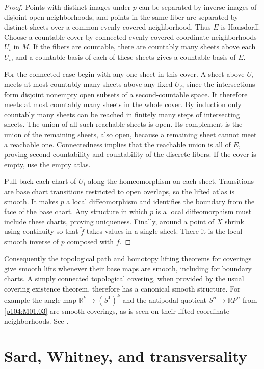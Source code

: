 \documentclass[11pt,oneside,openany]{book}
\theoremstyle{definition}
\theoremstyle{remark}
\newcommand{\R}{\mathbb R}
\begin{document}
\begin{proof}
Points with distinct images under \(p\) can be
separated by inverse images of disjoint open
neighborhoods, and points in the same fiber
are separated by distinct sheets over a common
evenly covered neighborhood. Thus \(E\) is
Hausdorff. Choose a countable cover by connected
evenly covered coordinate neighborhoods \(U_i\)
in \(M\). If the fibers are countable, there
are countably many sheets above each \(U_i\),
and a countable basis of each of these sheets
gives a countable basis of \(E\).

For the connected case begin with any one sheet
in this cover. A sheet above \(U_i\) meets
at most countably many sheets above any fixed
\(U_j\), since the intersections form disjoint
nonempty open subsets of a second-countable
space. It therefore meets at most countably
many sheets in the whole cover. By induction
only countably many sheets can be reached in
finitely many steps of intersecting sheets.
The union of all such reachable sheets is
open. Its complement is the union of the
remaining sheets, also open, because a
remaining sheet cannot meet a reachable
one. Connectedness implies that the reachable
union is all of \(E\), proving second
countability and countability of the discrete
fibers. If the cover is empty, use the
empty atlas.

Pull back each chart of \(U_i\) along the
homeomorphism on each sheet. Transitions are
base chart transitions restricted to open
overlaps, so the lifted atlas is smooth. It
makes \(p\) a local diffeomorphism and
identifies the boundary from the face of
the base chart. Any structure in which
\(p\) is a local diffeomorphism must include
these charts, proving uniqueness. Finally,
around a point of \(X\) shrink using
continuity so that \(\tilde f\) takes values
in a single sheet. There it is the local
smooth inverse of \(p\) composed with \(f\).
\end{proof}

Consequently the topological path and homotopy lifting
theorems for coverings give smooth lifts whenever
their base maps are smooth, including for boundary
charts. A simply connected topological covering, when
provided by the usual covering existence theorem,
therefore has a canonical smooth structure. For
example the angle map \(\R^k\to(S^1)^k\) and
the antipodal quotient \(S^n\to\R P^n\) from
\cref{p104:M01.03} are smooth coverings, as is seen
on their lifted coordinate neighborhoods.
See \cite[pp.~91--95]{lee}.
\chapter{Sard, Whitney, and transversality}
\end{document}
